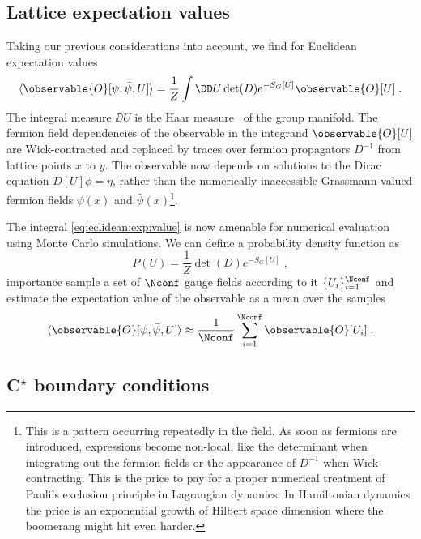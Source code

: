 \subsection{Lattice expectation values}

Taking our previous considerations into account, we find for Euclidean expectation values
\begin{equation} \label{eq:eclidean:exp:value}
\langle \observable{O}[\psi, \bar{\psi}, U] \rangle =
\frac{1}{Z}
\int \DD U
\det(D) e^{- S_G[U]}
\observable{O}[U] \;.
\end{equation}
The integral measure $\DD U$ is the Haar measure~\cite{haar1933} of the group manifold.
The fermion field dependencies of the observable in the integrand $\observable{O}[U]$ are Wick-contracted and replaced by traces over fermion propagators $D^{-1}$ from lattice points $x$ to $y$.
The observable now depends on solutions to the Dirac equation $D[U] \phi = \eta$, rather than the numerically inaccessible Grassmann-valued fermion fields $\psi(x)$ and $\bar{\psi}(x)$\footnote{This is a pattern occurring repeatedly in the field. As soon as fermions are introduced, expressions become non-local, like the determinant when integrating out the fermion fields or the appearance of $D^{-1}$ when Wick-contracting. This is the price to pay for a proper numerical treatment of Pauli's exclusion principle in Lagrangian dynamics. In Hamiltonian dynamics the price is an exponential growth of Hilbert space dimension where the boomerang might hit even harder.}.

The integral \cref{eq:eclidean:exp:value} is now amenable for numerical evaluation using Monte Carlo simulations.
We can define a probability density function as
\begin{equation}
P(U) = \frac{1}{Z} \det(D) e^{- S_G[U]} \;,
\end{equation}
importance sample a set of $\Nconf$ gauge fields according to it $\{U_i\}_{i=1}^{\Nconf}$ and estimate the expectation value of the observable as a mean over the samples
\begin{equation}
\langle \observable{O}[\psi, \bar{\psi}, U] \rangle \approx \frac{1}{\Nconf} \sum_{i=1}^{\Nconf} \observable{O}[U_i] \;.
\end{equation}

\subsection{C\texorpdfstring{$^{\star}$}{*} boundary conditions}

